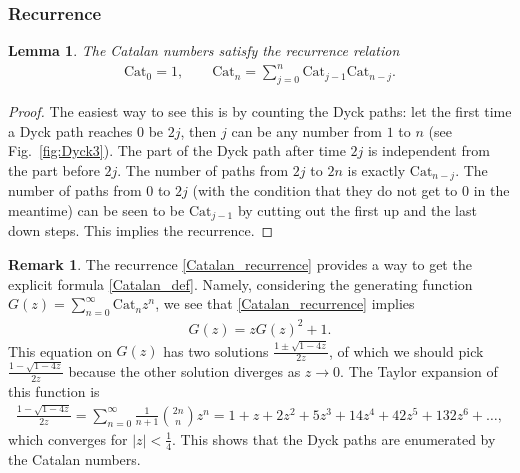 \documentclass[letterpaper,11pt,oneside,reqno]{amsart}
\numberwithin{equation}{section}
\newtheorem{lemma}[proposition]{Lemma}
\theoremstyle{definition}
\newtheorem{remark}[proposition]{Remark}
\begin{document}

\subsubsection{Recurrence} %
\label{ssub:recurrence}

\begin{lemma}\label{lemma:Dyck_and_recurrence}
The Catalan numbers satisfy the recurrence relation
\begin{align}\label{Catalan_recurrence}
	\mathrm{Cat}_0=1,\qquad
	\mathrm{Cat}_{n}=\sum_{j=0}^n \mathrm{Cat}_{j-1}\mathrm{Cat}_{n-j}.
\end{align}
\end{lemma}
\begin{proof}
	The easiest way to see this is by counting the Dyck paths: let the first time a Dyck path 
	reaches $0$ be $2j$, then $j$ can be any number from $1$ to $n$ (see Fig.~\ref{fig:Dyck3}). 
	The part of the Dyck path after time $2j$ is independent from the 
	part before $2j$. The number of paths 
	from $2j$ to $2n$ is exactly $\mathrm{Cat}_{n-j}$. The 
	number of paths from $0$ to $2j$ 
	(with the condition that they do not get to $0$ in the meantime)
	can be seen to be $\mathrm{Cat}_{j-1}$ by cutting out the first up and the 
	last down steps. This implies the recurrence.
\end{proof}

\begin{remark}\label{rmk:from_recurrence_to_explicit_formula}
	The recurrence \eqref{Catalan_recurrence} provides a way to 
	get the explicit formula \eqref{Catalan_def}. Namely, considering
	the generating function $G(z)=\sum_{n=0}^{\infty}\mathrm{Cat}_n z^{n}$, 
	we see that \eqref{Catalan_recurrence} implies
	\begin{align*}
		G(z)=zG(z)^{2}+1.
	\end{align*}
	This equation on $G(z)$ has two solutions $\frac{1\pm\sqrt{1-4z}}{2z}$, 
	of which we should pick 
	$\frac{1-\sqrt{1-4z}}{2z}$ because the other solution diverges as $z\to0$.
	The Taylor expansion of this function
	is
	\begin{align*}
		\frac{1-\sqrt{1-4z}}{2z}=
		\sum_{n=0}^{\infty}\frac{1}{n+1}\binom{2n}n z^{n}=
		1+z+2 z^2+5 z^3+14 z^4+42 z^5+132 z^6+\ldots,
	\end{align*}
	which converges for $|z|<\frac14$.
	This shows that the Dyck paths are enumerated by the Catalan numbers.
\end{remark}
\end{document}
